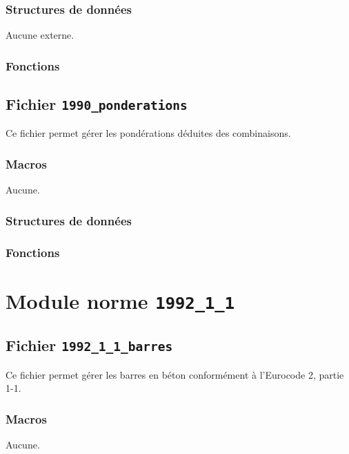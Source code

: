 \documentclass{article}
\begin{document}
\subsubsection{Structures de données}
Aucune externe.
\subsubsection{Fonctions}


\subsection{Fichier {\texttt{1990\_ponderations}}}
Ce fichier permet gérer les pondérations déduites des combinaisons.
\subsubsection{Macros}
Aucune.
\subsubsection{Structures de données}


\subsubsection{Fonctions}










\section{Module norme {\texttt{1992\_1\_1}}}
\subsection{Fichier {\texttt{1992\_1\_1\_barres}}}
Ce fichier permet gérer les barres en béton conformément à l'Eurocode 2, partie 1-1.
\subsubsection{Macros}
Aucune.
\end{document}
